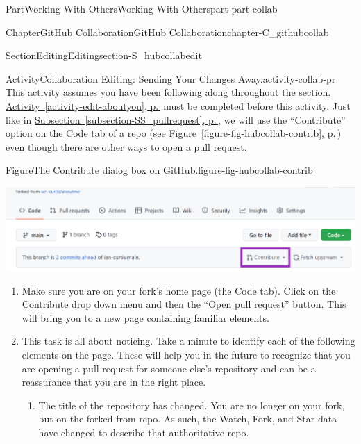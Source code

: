 \documentclass[twoside,10pt,]{book}
\newcommand{\xreffont}{\relax}
\begin{document}
\begin{partptx}{Part}{Working With Others}{}{Working With Others}{}{}{part-part-collab}
\begin{chapterptx}{Chapter}{GitHub Collaboration}{}{GitHub Collaboration}{}{}{chapter-C_githubcollab}
\begin{sectionptx}{Section}{Editing}{}{Editing}{}{}{section-S_hubcollabedit}
\begin{activity}{Activity}{Collaboration Editing: Sending Your Changes Away.}{activity-collab-pr}%
%
%
%
%
%
%
This activity assumes you have been following along throughout the section. \hyperref[activity-edit-aboutyou]{Activity~{\xreffont\ref{activity-edit-aboutyou}}, p.\,\pageref{activity-edit-aboutyou}} must be completed before this activity. Just like in \hyperref[subsection-SS_pullrequest]{Subsection~{\xreffont\ref{subsection-SS_pullrequest}}, p.\,\pageref{subsection-SS_pullrequest}}, we will use the ``Contribute'' option on the Code tab of a repo (see \hyperref[figure-fig-hubcollab-contrib]{Figure~{\xreffont\ref{figure-fig-hubcollab-contrib}}, p.\,\pageref{figure-fig-hubcollab-contrib}}) even though there are other ways to open a pull request.%
\begin{figureptx}{Figure}{The Contribute dialog box on GitHub.}{figure-fig-hubcollab-contrib}{}%
\begin{image}{0.025}{0.95}{0.025}{}%
\includegraphics[width=\linewidth]{external/hubcollab_contrib.pdf}
\end{image}%
\tcblower
\end{figureptx}%
\begin{enumerate}[font=\bfseries,label=(\alph*),ref=\alph*]%
\item{}Make sure you are on your fork's home page (the Code tab). Click on the Contribute drop down menu and then the ``Open pull request'' button. This will bring you to a new page containing familiar elements.%
\item{}This task is all about noticing. Take a minute to identify each of the following elements on the page. These will help you in the future to recognize that you are opening a pull request for someone else's repository and can be a reassurance that you are in the right place.%
\begin{enumerate}
\item{}The title of the repository has changed. You are no longer on your fork, but on the forked-from repo. As such, the Watch, Fork, and Star data have changed to describe that authoritative repo.%

\end{enumerate}
\end{enumerate}
\end{activity}
\end{sectionptx}
\end{chapterptx}
\end{partptx}
\end{document}
